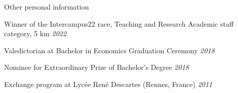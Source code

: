 \documentclass{resume} %
\begin{document}
\begin{rSection}{Other personal information} \itemsep -3pt
	\item Winner of the Intercampus22 race, Teaching and Research Academic staff category, 5 km \hfill {\em 2022}
	\item Valedictorian at Bachelor in Economics Graduation Ceremony \hfill {\em 2018}
	\item Nominee for Extraordinary Prize of Bachelor's Degree \hfill {\em 2018}
	\item {Exchange program at Lycée René Descartes (Rennes, France)} \hfill {\em 2011}
	
\end{rSection}

\end{document}
